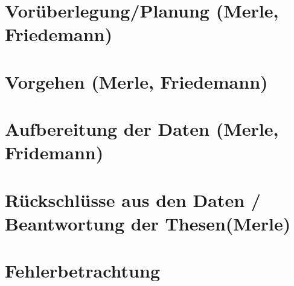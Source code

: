 \section{Vorüberlegung/Planung (Merle, Friedemann)}
\section{Vorgehen (Merle, Friedemann)}
\section{Aufbereitung der Daten (Merle, Fridemann)}
\section{Rückschlüsse aus den Daten / Beantwortung der Thesen(Merle)}
\section{Fehlerbetrachtung}